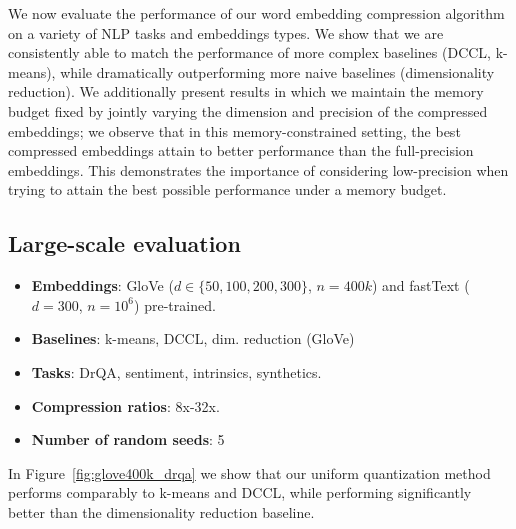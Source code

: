 We now evaluate the performance of our word embedding compression algorithm on a variety of NLP tasks and embeddings types.
We show that we are consistently able to match the performance of more complex baselines (DCCL, k-means), while dramatically outperforming more naive baselines (dimensionality reduction).
We additionally present results in which we maintain the memory budget fixed by  jointly varying the dimension and precision of the compressed embeddings;
we observe that in this memory-constrained setting, the best compressed embeddings attain  to  better performance than the full-precision embeddings.
This demonstrates the importance of considering low-precision when trying to attain the best possible performance under a memory budget.

\subsection{Large-scale evaluation}
\begin{itemize}
	\item \textbf{Embeddings}: GloVe ($d\in\{50,100,200,300\}$, $n=400k$) and fastText ($d=300$, $n=10^6$) pre-trained.
	\item \textbf{Baselines}: k-means, DCCL, dim. reduction (GloVe)
	\item \textbf{Tasks}: DrQA, sentiment, intrinsics, synthetics.
	\item \textbf{Compression ratios}: 8x-32x.
	\item \textbf{Number of random seeds}: 5
\end{itemize}

In Figure~\ref{fig:glove400k_drqa} we show that our uniform quantization method performs comparably to k-means and DCCL, while performing significantly better than the dimensionality reduction baseline.

